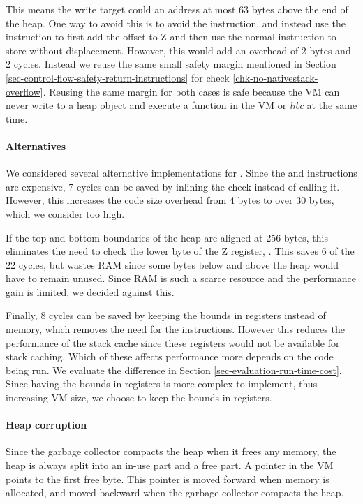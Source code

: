 This means the write target could an address at most 63 bytes above the end of the heap. One way to avoid this is to avoid the  instruction, and instead use the  instruction to first add the offset to Z and then use the normal  instruction to store without displacement. However, this would add an overhead of 2 bytes and 2 cycles. Instead we reuse the same small safety margin mentioned in Section \ref{sec-control-flow-safety-return-instructions} for check \ref{chk-no-nativestack-overflow}. Reusing the same margin for both cases is safe because the VM can never write to a heap object and execute a function in the VM or \emph{libc} at the same time.

\paragraph{Alternatives}
We considered several alternative implementations for . Since the  and  instructions are expensive, 7 cycles can be saved by inlining the check instead of calling it. However, this increases the code size overhead from 4 bytes to over 30 bytes, which we consider too high.

If the top and bottom boundaries of the heap are aligned at 256 bytes, this eliminates the need to check the lower byte of the Z register, . This saves 6 of the 22 cycles, but wastes RAM since some bytes below and above the heap would have to remain unused. Since RAM is such a scarce resource and the performance gain is limited, we decided against this.

Finally, 8 cycles can be saved by keeping the bounds in registers instead of memory, which removes the need for the  instructions. However this reduces the performance of the stack cache since these registers would not be available for stack caching. Which of these affects performance more depends on the code being run. We evaluate the difference in Section \ref{sec-evaluation-run-time-cost}. Since having the bounds in registers is more complex to implement, thus increasing VM size, we choose to keep the bounds in registers.

\paragraph{Heap corruption}
Since the garbage collector compacts the heap when it frees any memory, the heap is always split into an in-use part and a free part. A pointer in the VM points to the first free byte. This pointer is moved forward when memory is allocated, and moved backward when the garbage collector compacts the heap.

